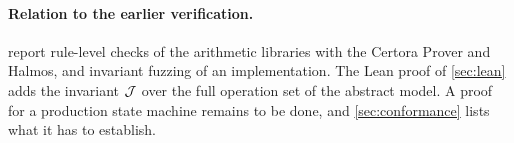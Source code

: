 \paragraph{Relation to the earlier verification.}  report rule-level checks of the arithmetic libraries with the Certora Prover and Halmos, and invariant fuzzing of an implementation. The Lean proof of \cref{sec:lean} adds the invariant $\mathcal{J}$ over the full operation set of the abstract model. A proof for a production state machine remains to be done, and \cref{sec:conformance} lists what it has to establish.
